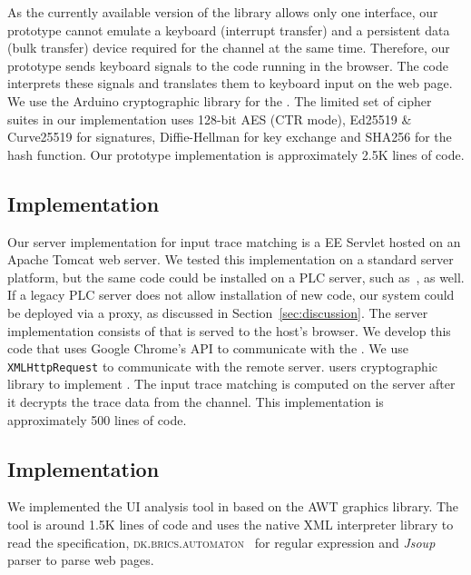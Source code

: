 As the currently available version of the \webusb library \cite{webusb} allows only one \usb interface, our prototype cannot emulate a keyboard (interrupt transfer) and a persistent data (bulk transfer) device required for the \tls channel at the same time. Therefore, our prototype sends keyboard signals to the \js code running in the browser. The \js code interprets these signals and translates them to keyboard input on the web page.
We use the Arduino cryptographic library for the \tls. The limited set of cipher suites in our \tls implementation uses 128-bit AES (CTR mode), Ed25519 \& Curve25519 for signatures, Diffie-Hellman for key exchange and SHA256 for the hash function. Our prototype implementation is approximately 2.5K lines of code. 


\subsection{\server Implementation} 

Our server implementation for input trace matching is a \java EE Servlet hosted on an Apache Tomcat web server. We tested this implementation on a standard server platform, but the same code could be installed on a PLC server, such as~\cite{controlbyweb,siemens,siemens2,schneider}, as well. If a legacy PLC server does not allow installation of new code, our system could be deployed via a proxy, as discussed in Section~\ref{sec:discussion}. The server implementation consists of \js that is served to the host's browser. We develop this \js code that uses Google Chrome's \webusb API to communicate with the \device. We use \texttt{XMLHttpRequest} to communicate with the remote server. \server users \java cryptographic library to implement \tls. The input trace matching is computed on the server after it decrypts the trace data from the \tls channel. This implementation is approximately 500 lines of code.


\subsection{\tool Implementation} 

We implemented the UI analysis tool in \java based on the \java AWT graphics library. The tool is around 1.5K lines of code and uses the \java native XML interpreter library to read the specification, \textsc{dk.brics.automaton}~\cite{brics} for regular expression and \emph{Jsoup} \html parser to parse web pages. 



